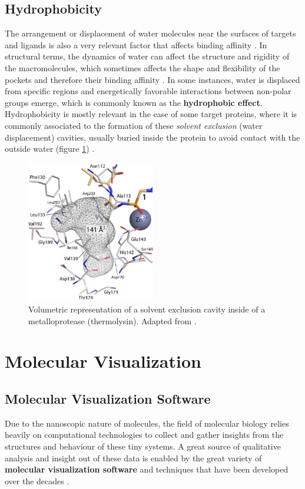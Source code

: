   \subsection{Hydrophobicity}
    The arrangement or displacement of water molecules near the surfaces of targets and ligands is also a very relevant factor that affects binding affinity \cite{hydrophobic_2017, hydrophobic_2022}. In structural terms, the dynamics of water can affect the structure and rigidity of the macromolecules, which sometimes affects the shape and flexibility of the pockets and therefore their binding affinity \cite{hydrophobic_2022}. In some instances, water is displaced from specific regions and energetically favorable interactions between non-polar groups emerge, which is commonly known as the \textbf{hydrophobic effect}. Hydrophobicity is mostly relevant in the case of some target proteins, where it is commonly associated to the formation of these \textit{solvent exclusion} (water displacement) cavities, usually buried inside the protein to avoid contact with the outside water (figure \ref{fig:intro/hydrophobic}) \cite{hydrophobic_2017}.

    \begin{figure}[H]
      \centering
      \includegraphics[width=0.5\textwidth]{figures/intro/hydrophobic.png}
      \caption{\label{fig:intro/hydrophobic} Volumetric representation of a solvent exclusion cavity inside of a metalloprotease (thermolysin). Adapted from \cite{hydrophobic_2017}.}
    \end{figure}


\section{Molecular Visualization}
  \subsection{Molecular Visualization Software}
    Due to the nanoscopic nature of molecules, the field of molecular biology relies heavily on computational technologies to collect and gather insights from the structures and behaviour of these tiny systems. A great source of qualitative analysis and insight out of these data is enabled by the great variety of \textbf{molecular visualization software} and techniques that have been developed over the decades \cite{visualization_2018}.

